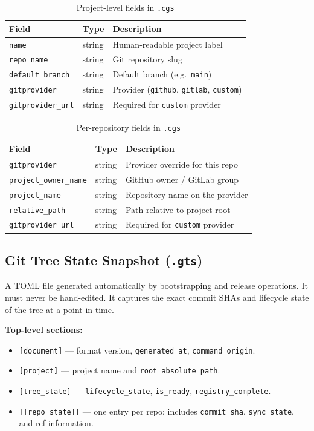 \begin{table}[h]
\centering
\begin{tabular}{lll}
\hline
\textbf{Field} & \textbf{Type} & \textbf{Description} \\
\hline
\texttt{name}           & string  & Human-readable project label \\
\texttt{repo\_name}     & string  & Git repository slug \\
\texttt{default\_branch}& string  & Default branch (e.g.\ \texttt{main}) \\
\texttt{gitprovider}    & string  & Provider (\texttt{github}, \texttt{gitlab}, \texttt{custom}) \\
\texttt{gitprovider\_url}& string & Required for \texttt{custom} provider \\
\hline
\end{tabular}
\caption{Project-level fields in \texttt{.cgs}}
\label{tab:project-fields}
\end{table}

\begin{table}[h]
\centering
\begin{tabular}{lll}
\hline
\textbf{Field} & \textbf{Type} & \textbf{Description} \\
\hline
\texttt{gitprovider}         & string  & Provider override for this repo \\
\texttt{project\_owner\_name}& string  & GitHub owner / GitLab group \\
\texttt{project\_name}       & string  & Repository name on the provider \\
\texttt{relative\_path}      & string  & Path relative to project root \\
\texttt{gitprovider\_url}    & string  & Required for \texttt{custom} provider \\
\hline
\end{tabular}
\caption{Per-repository fields in \texttt{.cgs}}
\label{tab:repo-fields}
\end{table}

\subsection{Git Tree State Snapshot (\texttt{.gts})}

A TOML file generated automatically by bootstrapping and release operations.
It must never be hand-edited. It captures the exact commit SHAs and lifecycle
state of the tree at a point in time.

\textbf{Top-level sections:}
\begin{itemize}
  \item \texttt{[document]} — format version, \texttt{generated\_at},
        \texttt{command\_origin}.
  \item \texttt{[project]} — project name and \texttt{root\_absolute\_path}.
  \item \texttt{[tree\_state]} — \texttt{lifecycle\_state}, \texttt{is\_ready},
        \texttt{registry\_complete}.
  \item \texttt{[[repo\_state]]} — one entry per repo; includes
        \texttt{commit\_sha}, \texttt{sync\_state}, and ref information.
\end{itemize}

